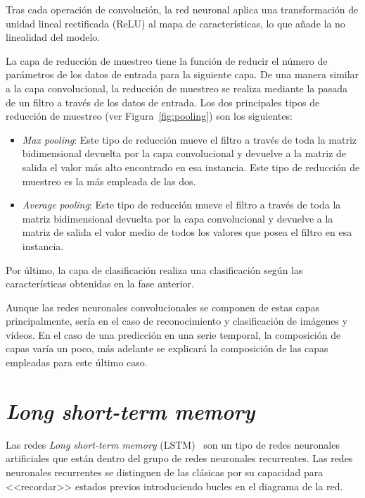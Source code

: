 Tras cada operación de convolución, la red neuronal aplica una transformación de unidad lineal rectificada (ReLU) al mapa de características, lo que añade la no linealidad del modelo.

\par

La capa de reducción de muestreo tiene la función de reducir el número de parámetros de los datos de entrada para la siguiente capa. De una manera similar a la capa convolucional, la reducción de muestreo se realiza mediante la pasada de un filtro a través de los datos de entrada. Los dos principales tipos de reducción de muestreo (ver Figura~\ref{fig:pooling}) son los siguientes:
\begin{itemize}
    \item \textit{Max pooling}: Este tipo de reducción mueve el filtro a través de toda la matriz bidimensional devuelta por la capa convolucional y devuelve a la matriz de salida el valor más alto encontrado en esa instancia. Este tipo de reducción de muestreo es la más empleada de las dos.
    \item \textit{Average pooling}: Este tipo de reducción mueve el filtro a través de toda la matriz bidimensional devuelta por la capa convolucional y devuelve a la matriz de salida el valor medio de todos los valores que posea el filtro en esa instancia.
\end{itemize}


Por último, la capa de clasificación realiza una clasificación según las características obtenidas en la fase anterior.

\par

Aunque las redes neuronales convolucionales se componen de estas capas principalmente, sería en el caso de reconocimiento y clasificación de imágenes y vídeos. En el caso de una predicción en una serie temporal, la composición de capas varía un poco, más adelante se explicará la composición de las capas empleadas para este último caso.

\section{\textit{Long short-term memory}}

Las redes \textit{Long short-term memory} (LSTM)~\cite{lstm} son un tipo de redes neuronales artificiales que están dentro del grupo de redes neuronales recurrentes. Las redes neuronales recurrentes se distinguen de las clásicas por su capacidad para <<recordar>> estados previos introduciendo bucles en el diagrama de la red.

